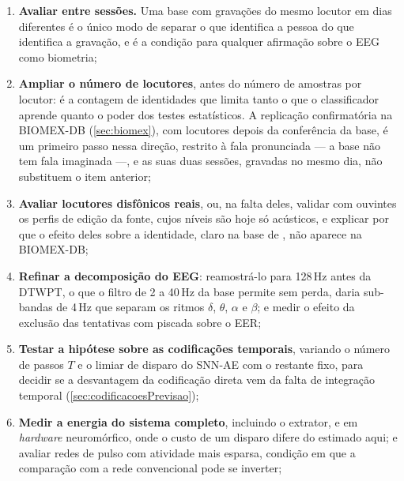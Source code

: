 		\begin{enumerate}
			\item \textbf{Avaliar entre sessões.} Uma base com gravações do mesmo
			locutor em dias diferentes é o único modo de separar o que identifica a
			pessoa do que identifica a gravação, e é a condição para qualquer
			afirmação sobre o \ac{EEG} como biometria;

			\item \textbf{Ampliar o número de locutores}, antes do número de
			amostras por locutor: é a contagem de identidades que limita tanto o
			que o classificador aprende quanto o poder dos testes estatísticos. A
			replicação confirmatória na BIOMEX-DB \cite{morenorodriguez2021biomex}
			(\autoref{sec:biomex}), com  locutores depois da
			conferência da base, é um primeiro passo nessa direção, restrito à fala
			pronunciada --- a base não tem fala imaginada ---, e as suas duas sessões,
			gravadas no mesmo dia, não substituem o item anterior;

			\item \textbf{Avaliar locutores disfônicos reais}, ou, na falta deles,
			validar com ouvintes os perfis de edição da fonte, cujos níveis são hoje
			só acústicos, e explicar por que o efeito deles sobre a identidade, claro
			na base de , não aparece na BIOMEX-DB;

			\item \textbf{Refinar a decomposição do \ac{EEG}}: reamostrá-lo para
			128\,Hz antes da \ac{DTWPT}, o que o filtro de 2 a 40\,Hz da base permite sem perda,
			daria sub-bandas de 4\,Hz que separam os ritmos $\delta$, $\theta$,
			$\alpha$ e $\beta$; e medir o efeito da exclusão das tentativas com
			piscada sobre o \ac{EER};

			\item \textbf{Testar a hipótese sobre as codificações temporais},
			variando o número de passos $T$ e o limiar de disparo do \ac{SNN}-AE
			com o restante fixo, para decidir se a desvantagem da codificação
			direta vem da falta de integração temporal
			(\autoref{sec:codificacoesPrevisao});

			\item \textbf{Medir a energia do sistema completo}, incluindo o
			extrator, e em \textit{hardware} neuromórfico, onde o custo de um
			disparo difere do estimado aqui; e avaliar redes de pulso com atividade
			mais esparsa, condição em que a comparação com a rede convencional pode
			se inverter;


\end{enumerate}
